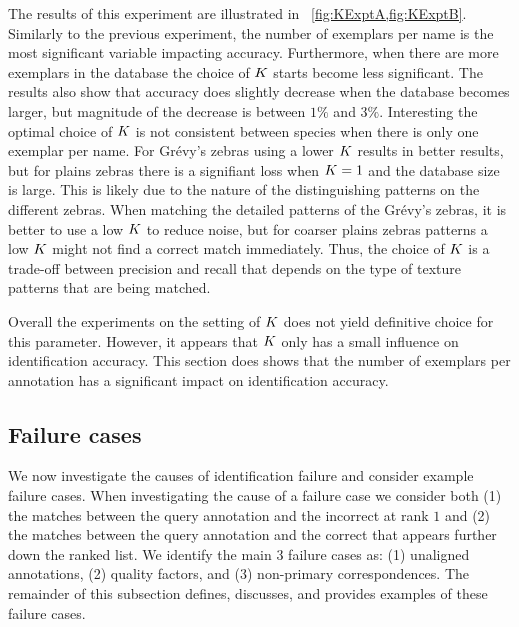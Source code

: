         The results of this experiment are illustrated in ~\cref{fig:KExptA,fig:KExptB}. Similarly to the previous
        experiment, the number of exemplars per name is the most significant variable impacting accuracy.
        Furthermore, when there are more exemplars in the database the choice of $K$ starts become less
        significant. The results also show that accuracy does slightly decrease when the database becomes larger,
        but magnitude of the decrease is between $1\percent$ and $3\percent$. Interesting the optimal choice of
        $K$ is not consistent between species when there is only one exemplar per name. For Grévy's zebras using a
        lower $K$ results in better results, but for plains zebras there is a signifiant loss when $K=1$ and the
        database size is large. This is likely due to the nature of the distinguishing patterns on the different
        zebras. When matching the detailed patterns of the Grévy's zebras, it is better to use a low $K$ to reduce
        noise, but for coarser plains zebras patterns a low $K$ might not find a correct match immediately. Thus,
        the choice of $K$ is a trade-off between precision and recall that depends on the type of texture patterns
        that are being matched.
        
        Overall the experiments on the setting of $K$ does not yield definitive choice for this parameter.
        However, it appears that $K$ only has a small influence on identification accuracy. This section does
        shows that the number of exemplars per annotation has a significant impact on identification accuracy.

        \KExptA{}
        \KExptB{}

    \FloatBarrier{}
    \subsection{Failure cases}\label{sub:exptfail}  
        
        We now investigate the causes of identification failure and consider example failure cases. When
        investigating the cause of a failure case we consider both (1) the matches between the query annotation and
        the incorrect \name{}  at rank $1$ and (2) the matches between the query annotation and the correct \name{}
        that appears further down the ranked list. We identify the main 3 failure cases as: (1) unaligned
        annotations, (2) quality factors, and (3) non-primary correspondences. The remainder of this subsection
        defines, discusses, and provides examples of these failure cases.

